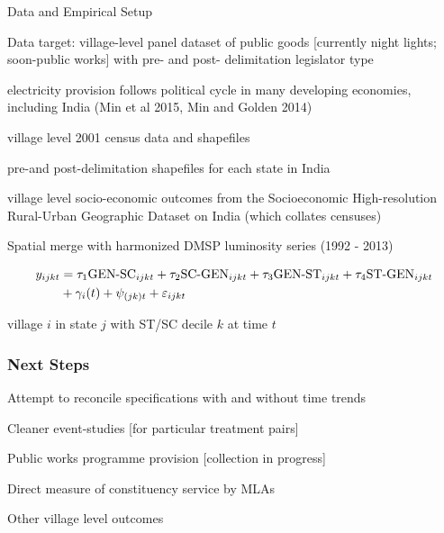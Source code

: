 \documentclass[12pt, aspectratio=169]{beamer}
\begin{document}
\begin{frame}{Data and Empirical Setup}

\bi
\item Data target: village-level panel dataset of public goods
  [currently night lights; soon-public works] with pre- and post-
  delimitation legislator type
  \scriptsize
\item electricity provision follows political cycle in many developing economies, including India (Min et al 2015, Min and Golden 2014)
\normalsize
  \be
  \item village level 2001 census data and shapefiles
  \item pre-and post-delimitation shapefiles for each state in India
  \item village level socio-economic outcomes from the Socioeconomic High-resolution Rural-Urban Geographic Dataset on India (which collates censuses)
  \item Spatial merge with harmonized DMSP luminosity series (1992 - 2013)
  \ee
\ei


\begin{align*}
y_{ijkt} & = \tau_1 \text{GEN-SC}_{ijkt} + \tau_2 \text{SC-GEN}_{ijkt} +
\tau_3 \text{GEN-ST}_{ijkt} + \tau_4 \text{ST-GEN}_{ijkt}  \\
& + \gamma_i(t) + \psi_{(jk)t} + \varepsilon_{ijkt}
\end{align*}

village $i$ in state $j$ with ST/SC decile $k$ at time $t$

\end{frame}

\begin{frame}
\tiny
\center

\end{frame}


\begin{frame}[t]\frametitle{Next Steps}
\be
  \item Attempt to reconcile specifications with and without time trends
  \item Cleaner event-studies [for particular treatment pairs]
  \item Public works programme provision [collection in progress]
  \item Direct measure of constituency service by MLAs
  \item Other village level outcomes
\ee
\end{frame}
\end{document}
